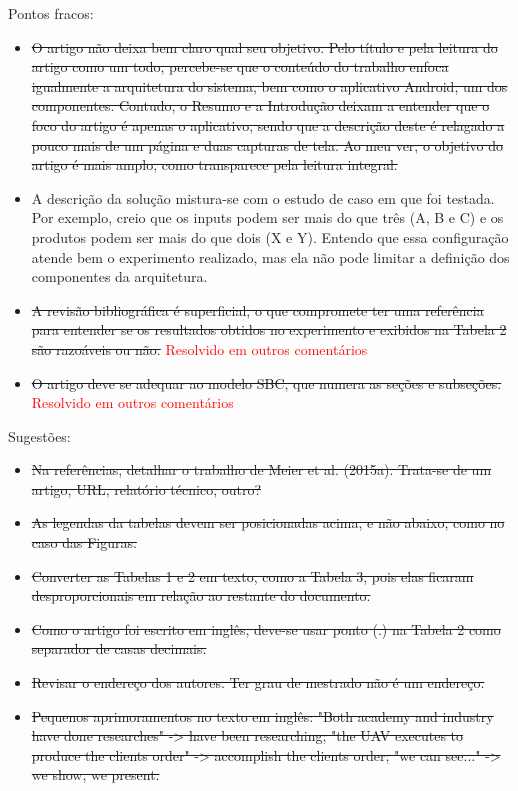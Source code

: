 \documentclass[12pt]{article}
\begin{document}
Pontos fracos:

\begin{itemize}

\item \sout{O artigo não deixa bem claro qual seu objetivo. Pelo título e pela leitura do artigo como um todo, percebe-se que o conteúdo do trabalho enfoca igualmente a arquitetura do sistema, bem como o aplicativo Android, um dos componentes. Contudo, o Resumo e a Introdução deixam a entender que o foco do artigo é apenas o aplicativo, sendo que a descrição deste é relagado a pouco mais de um página e duas capturas de tela. Ao meu ver, o objetivo do artigo é mais amplo, como transparece pela leitura integral.}

\item A descrição da solução mistura-se com o estudo de caso em que foi testada. Por exemplo, creio que os inputs podem ser mais do que três (A, B e C) e os produtos podem ser mais do que dois (X e Y). Entendo que essa configuração atende bem o experimento realizado, mas ela não pode limitar a definição dos componentes da arquitetura.

\item \sout{A revisão bibliográfica é superficial, o que compromete ter uma referência para entender se os resultados obtidos no experimento e exibidos na Tabela 2 são razoáveis ou não.} \textcolor{red}{Resolvido em outros comentários}

\item \sout{O artigo deve se adequar ao modelo SBC, que numera as seções e subseções.} \textcolor{red}{Resolvido em outros comentários}

\end{itemize}

Sugestões:

\begin{itemize}

\item \sout{Na referências, detalhar o trabalho de Meier et al. (2015a). Trata-se de um artigo, URL, relatório técnico, outro?}

\item \sout{As legendas da tabelas devem ser posicionadas acima, e não abaixo, como no caso das Figuras.}

\item \sout{Converter as Tabelas 1 e 2 em texto, como a Tabela 3, pois elas ficaram desproporcionais em relação ao restante do documento.}

\item \sout{Como o artigo foi escrito em inglês, deve-se usar ponto (.) na Tabela 2 como separador de casas decimais.}

\item \sout{Revisar o endereço dos autores. Ter grau de mestrado não é um endereço.}

\item \sout{Pequenos aprimoramentos no texto em inglês: "Both academy and industry have done researches" -> have been researching; "the UAV executes to produce the clients order" -> accomplish the clients order; "we can see..." -> we show, we present.}

\end{itemize}
\end{document}
